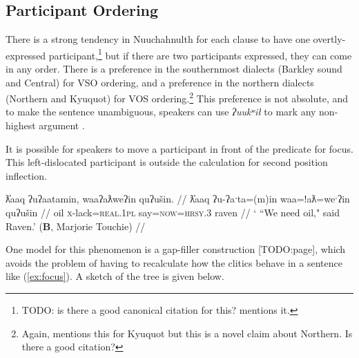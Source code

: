 
\subsection{Participant Ordering}

There is a strong tendency in Nuuchahnulth for each clause to have one overtly-expressed participant,\footnote{TODO: is there a good canonical citation for this? \cite{rose1981} mentions it.} but if there are two participants expressed, they can come in any order. There is a preference in the southernmost dialects (Barkley sound and Central) for VSO ordering, and a preference in the northern dialects (Northern and Kyuquot) for VOS ordering.\footnote{Again, \cite{rose1981} mentions this for Kyuquot but this is a novel claim about Northern. Is there a good citation?} This preference is not absolute, and to make the sentence unambiguous, speakers can use \textit{ʔuukʷił} to mark any non-highest argument \citep{woo2007b}.

It is possible for speakers to move a participant in front of the predicate for focus. This left-dislocated participant is outside the calculation for second position inflection.

\ex \label{ex:focus}
\begingl
\glpreamble ƛ̓aaq ʔuʔaatamin, waaʔaƛweʔin quʔušin. //
\gla ƛ̓aaq ʔu-ʔaˑta=(m)in waa=!aƛ=weˑʔin quʔušin //
\glb oil \textsc{x}-lack=\textsc{real.1pl} say=\textsc{now}=\textsc{hrsy.3} raven //
\glft ‘ ``We need oil," said Raven.’ (\textbf{B}, Marjorie Touchie) //
\endgl
\xe

One model for this phenomenon is a gap-filler construction \citep{pollardsag1994}[TODO:page], which avoids the problem of having to recalculate how the clitics behave in a sentence like (\ref{ex:focus}). A sketch of the tree is given below.


